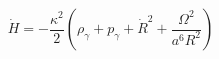 \begin{equation}\label{sys1}
\dot{H}=-\frac{\kappa^2}{2}(\rho_\gamma+p_\gamma+\dot{R}^2 +
\frac{\Omega^2}{a^6R^2})
\end{equation}

